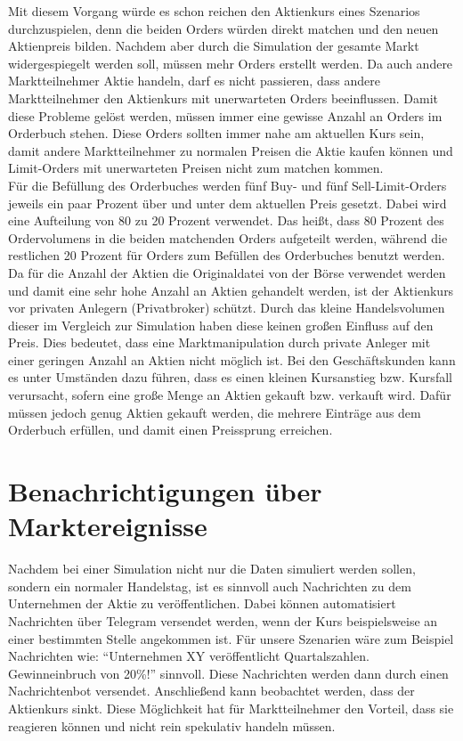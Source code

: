 Mit diesem Vorgang würde es schon reichen den Aktienkurs eines Szenarios durchzuspielen, denn die beiden Orders würden direkt matchen und den neuen Aktienpreis bilden.
Nachdem aber durch die Simulation der gesamte Markt widergespiegelt werden soll, müssen mehr Orders erstellt werden.
Da auch andere Marktteilnehmer Aktie handeln, darf es nicht passieren, dass andere Marktteilnehmer 
den Aktienkurs mit unerwarteten Orders beeinflussen. Damit diese Probleme gelöst werden, müssen immer eine gewisse Anzahl an Orders 
im Orderbuch stehen. Diese Orders sollten immer nahe am aktuellen Kurs sein, damit andere Marktteilnehmer zu normalen Preisen die 
Aktie kaufen können und Limit-Orders mit unerwarteten Preisen nicht zum matchen kommen. \\
Für die Befüllung des Orderbuches werden fünf Buy- und fünf Sell-Limit-Orders jeweils ein paar Prozent über und unter dem aktuellen 
Preis gesetzt. Dabei wird eine Aufteilung von 80 zu 20 Prozent verwendet.
Das heißt, dass 80 Prozent des Ordervolumens in die beiden matchenden Orders aufgeteilt werden, während die restlichen 20 Prozent für Orders zum Befüllen des Orderbuches benutzt werden.\\
Da für die Anzahl der Aktien die Originaldatei von der Börse verwendet werden und damit eine sehr hohe Anzahl an Aktien gehandelt werden, ist der Aktienkurs vor 
privaten Anlegern (Privatbroker) schützt.
Durch das kleine Handelsvolumen dieser im Vergleich zur Simulation haben diese keinen großen Einfluss auf den Preis. Dies bedeutet, dass eine Marktmanipulation durch private Anleger mit 
einer geringen Anzahl an Aktien nicht möglich ist. Bei den Geschäftskunden kann es unter Umständen dazu führen, dass es einen kleinen Kursanstieg bzw. Kursfall 
verursacht, sofern eine große Menge an Aktien gekauft bzw. verkauft wird.
Dafür müssen jedoch genug Aktien gekauft werden, die mehrere Einträge aus dem Orderbuch 
erfüllen, und damit einen Preissprung erreichen.


\section{Benachrichtigungen über Marktereignisse}
Nachdem bei einer Simulation nicht nur die Daten simuliert werden sollen, sondern ein normaler Handelstag, ist es sinnvoll auch Nachrichten 
zu dem Unternehmen der Aktie zu veröffentlichen. Dabei können automatisiert Nachrichten über Telegram versendet werden, wenn der Kurs beispielsweise 
an einer bestimmten Stelle angekommen ist. Für unsere Szenarien wäre zum Beispiel Nachrichten wie: \enquote{Unternehmen XY veröffentlicht Quartalszahlen. 
Gewinneinbruch von 20\%!} sinnvoll. Diese Nachrichten werden dann durch einen Nachrichtenbot versendet.
Anschließend kann beobachtet werden, dass der Aktienkurs sinkt. Diese Möglichkeit hat für Marktteilnehmer den Vorteil, dass sie reagieren können und nicht 
rein spekulativ handeln müssen.
